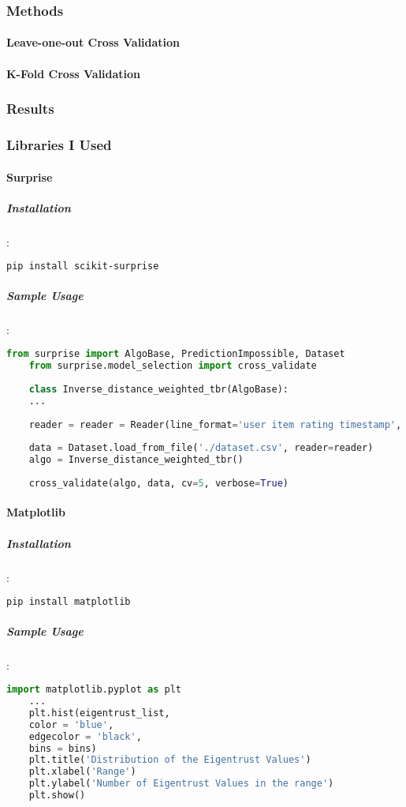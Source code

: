 	\subsubsection{Methods}
	\paragraph{Leave-one-out Cross Validation}
	\paragraph{K-Fold Cross Validation}
	\subsubsection{Results}
	\subsubsection{Libraries I Used}
	\paragraph{Surprise}
	\subparagraph{Installation}:
	\begin{lstlisting}[language=bash]
	pip install scikit-surprise
	\end{lstlisting}
	
	\subparagraph{Sample Usage}:
	\begin{lstlisting}[language=python, caption=Surprise example]
	from surprise import AlgoBase, PredictionImpossible, Dataset
	from surprise.model_selection import cross_validate
	
	class Inverse_distance_weighted_tbr(AlgoBase):
	...
	
	reader = reader = Reader(line_format='user item rating timestamp', sep=';', rating_scale=(1, 5))
	
	data = Dataset.load_from_file('./dataset.csv', reader=reader)
	algo = Inverse_distance_weighted_tbr()
	
	cross_validate(algo, data, cv=5, verbose=True)
	\end{lstlisting}
	
	\paragraph{Matplotlib}
	\subparagraph{Installation}:
	\begin{lstlisting}[language=bash]
	pip install matplotlib
	\end{lstlisting}
	
	\subparagraph{Sample Usage}:
	\begin{lstlisting}[language=python, caption=Matplotlib example]
	import matplotlib.pyplot as plt
	...
	plt.hist(eigentrust_list, 
	color = 'blue', 
	edgecolor = 'black',
	bins = bins)
	plt.title('Distribution of the Eigentrust Values')
	plt.xlabel('Range')
	plt.ylabel('Number of Eigentrust Values in the range')
	plt.show() 
	\end{lstlisting}